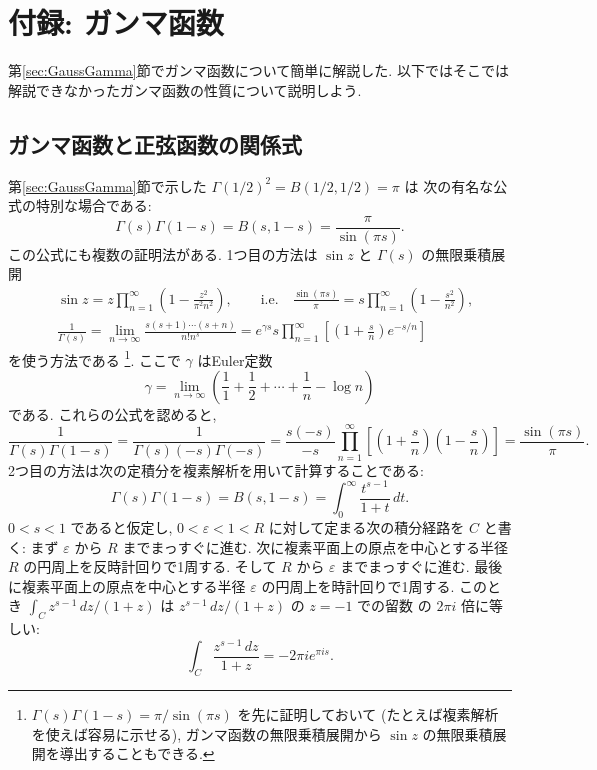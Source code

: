 \documentclass[12pt,twoside]{jarticle}
\newcommand\eps{\varepsilon}
\theoremstyle{jplain}
\theoremstyle{jplain}
\theoremstyle{jplain}
\numberwithin{theorem}{section}
\numberwithin{equation}{section}
\numberwithin{figure}{section}
\numberwithin{table}{section}
\newcommand\secref[1]{第\ref{#1}節}
\begin{document}

\section{付録: ガンマ函数}

\secref{sec:GaussGamma}でガンマ函数について簡単に解説した.
以下ではそこでは解説できなかったガンマ函数の性質について説明しよう.

\subsection{ガンマ函数と正弦函数の関係式}

\secref{sec:GaussGamma}で示した $\Gamma(1/2)^2=B(1/2,1/2)=\pi$ は
次の有名な公式の特別な場合である:
\[
\Gamma(s)\Gamma(1-s)=B(s,1-s)=\frac{\pi}{\sin(\pi s)}.
\]
この公式にも複数の証明法がある.
1つ目の方法は $\sin z$ と $\Gamma(s)$ の無限乗積展開
\begin{align*}
&
\sin z = z\prod_{n=1}^\infty\left(1-\frac{z^2}{\pi^2 n^2}\right),
\qquad\text{i.e.}\quad
\frac{\sin(\pi s)}{\pi}=s\prod_{n=1}^\infty\left(1-\frac{s^2}{n^2}\right),
\\ &
\frac{1}{\Gamma(s)}
=\lim_{n\to\infty}\frac{s(s+1)\cdots(s+n)}{n!n^s}
=e^{\gamma s}s\prod_{n=1}^\infty\left[ \left(1+\frac{s}{n}\right)e^{-s/n} \right]
\end{align*}
を使う方法である%
\footnote{$\Gamma(s)\Gamma(1-s)=\pi/\sin(\pi s)$ を先に証明しておいて
(たとえば複素解析を使えば容易に示せる),
ガンマ函数の無限乗積展開から $\sin z$ の無限乗積展開を導出することもできる.}.
ここで $\gamma$ はEuler定数
\[
\gamma=\lim_{n\to\infty}\left(\frac11+\frac12+\cdots+\frac1n-\log n\right)
\]
である. これらの公式を認めると,
\[
\frac{1}{\Gamma(s)\Gamma(1-s)}
=\frac{1}{\Gamma(s)(-s)\Gamma(-s)}
=\frac{s(-s)}{-s}\prod_{n=1}^\infty\left[\left(1+\frac{s}{n}\right)\left(1-\frac{s}{n}\right)\right]
=\frac{\sin(\pi s)}{\pi}.
\]
2つ目の方法は次の定積分を複素解析を用いて計算することである:
\[
\Gamma(s)\Gamma(1-s)=B(s,1-s) = \int_0^\infty \frac{t^{s-1}}{1+t}\,dt.
\]
$0<s<1$ であると仮定し, $0<\eps<1<R$ に対して定まる次の積分経路を $C$ と書く:
まず $\eps$ から $R$ までまっすぐに進む.
次に複素平面上の原点を中心とする半径 $R$ の円周上を反時計回りで1周する.
そして $R$ から $\eps$ までまっすぐに進む.
最後に複素平面上の原点を中心とする半径 $\eps$ の円周上を時計回りで1周する.
このとき $\int_C z^{s-1}\,dz/(1+z)$ は $z^{s-1}\,dz/(1+z)$ の $z=-1$ での留数
の $2\pi i$ 倍に等しい:
\[
\int_C \frac{z^{s-1}\,dz}{1+z} = - 2\pi i e^{\pi i s}.
\]
\end{document}
